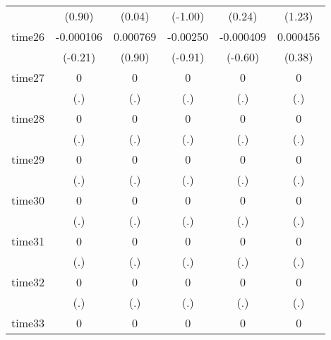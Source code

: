 \begin{table}[htbp]
\begin{tabular}{l*{5}{c}}
            &      (0.90)         &      (0.04)         &     (-1.00)         &      (0.24)         &      (1.23)         \\
time26      &   -0.000106         &    0.000769         &    -0.00250         &   -0.000409         &    0.000456         \\
            &     (-0.21)         &      (0.90)         &     (-0.91)         &     (-0.60)         &      (0.38)         \\
time27      &           0         &           0         &           0         &           0         &           0         \\
            &         (.)         &         (.)         &         (.)         &         (.)         &         (.)         \\
time28      &           0         &           0         &           0         &           0         &           0         \\
            &         (.)         &         (.)         &         (.)         &         (.)         &         (.)         \\
time29      &           0         &           0         &           0         &           0         &           0         \\
            &         (.)         &         (.)         &         (.)         &         (.)         &         (.)         \\
time30      &           0         &           0         &           0         &           0         &           0         \\
            &         (.)         &         (.)         &         (.)         &         (.)         &         (.)         \\
time31      &           0         &           0         &           0         &           0         &           0         \\
            &         (.)         &         (.)         &         (.)         &         (.)         &         (.)         \\
time32      &           0         &           0         &           0         &           0         &           0         \\
            &         (.)         &         (.)         &         (.)         &         (.)         &         (.)         \\
time33      &           0         &           0         &           0         &           0         &           0         \\

\end{tabular}
\end{table}
